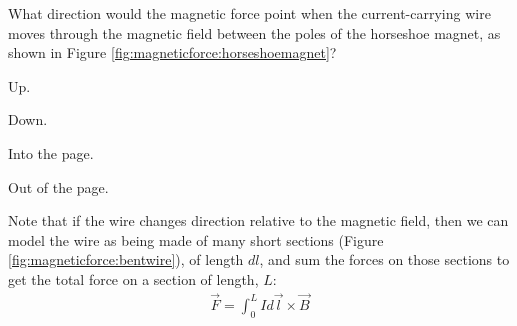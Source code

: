\begin{checkpoint}{}
	\begin{MCquestion}{What direction would the magnetic force point when the current-carrying wire moves through the magnetic field between the poles of the horseshoe magnet, as shown in Figure \ref{fig:magneticforce:horseshoemagnet}?}
		\item Up. \correct
		\item Down.
		\item Into the page.
		\item Out of the page.
	\end{MCquestion}
\end{checkpoint}

Note that if the wire changes direction relative to the magnetic field, then we can model the wire as being made of many short sections (Figure \ref{fig:magneticforce:bentwire}), of length $dl$, and sum the forces on those sections to get the total force on a section of length, $L$:
\begin{align*}
\vec F = \int_0^L I d\vec l \times \vec B
\end{align*}

